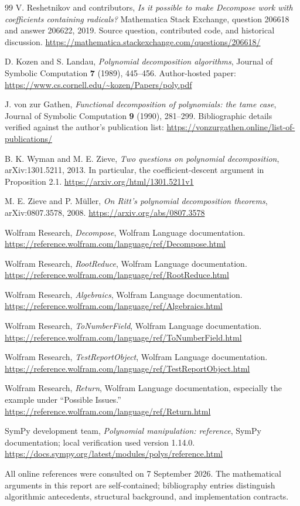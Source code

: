 \documentclass[11pt,a4paper]{article}
\numberwithin{equation}{section}
\theoremstyle{definition}
\theoremstyle{remark}
\begin{document}
\begin{thebibliography}{99}
V. Reshetnikov and contributors,
\emph{Is it possible to make Decompose work with coefficients containing
radicals?} Mathematica Stack Exchange, question 206618 and answer 206622,
2019. Source question, contributed code, and historical discussion.
\url{https://mathematica.stackexchange.com/questions/206618/}

D. Kozen and S. Landau,
\emph{Polynomial decomposition algorithms},
Journal of Symbolic Computation \textbf{7} (1989), 445--456.
Author-hosted paper:
\url{https://www.cs.cornell.edu/~kozen/Papers/poly.pdf}

J. von zur Gathen,
\emph{Functional decomposition of polynomials: the tame case},
Journal of Symbolic Computation \textbf{9} (1990), 281--299.
Bibliographic details verified against the author's publication list:
\url{https://vonzurgathen.online/list-of-publications/}

B. K. Wyman and M. E. Zieve,
\emph{Two questions on polynomial decomposition}, arXiv:1301.5211, 2013.
In particular, the coefficient-descent argument in Proposition 2.1.
\url{https://arxiv.org/html/1301.5211v1}

M. E. Zieve and P. M\"uller,
\emph{On Ritt's polynomial decomposition theorems}, arXiv:0807.3578, 2008.
\url{https://arxiv.org/abs/0807.3578}

Wolfram Research, \emph{Decompose}, Wolfram Language documentation.
\url{https://reference.wolfram.com/language/ref/Decompose.html}

Wolfram Research, \emph{RootReduce}, Wolfram Language documentation.
\url{https://reference.wolfram.com/language/ref/RootReduce.html}

Wolfram Research, \emph{Algebraics}, Wolfram Language documentation.
\url{https://reference.wolfram.com/language/ref/Algebraics.html}

Wolfram Research, \emph{ToNumberField}, Wolfram Language documentation.
\url{https://reference.wolfram.com/language/ref/ToNumberField.html}

Wolfram Research, \emph{TestReportObject}, Wolfram Language documentation.
\url{https://reference.wolfram.com/language/ref/TestReportObject.html}

Wolfram Research, \emph{Return}, Wolfram Language documentation,
especially the example under ``Possible Issues.''
\url{https://reference.wolfram.com/language/ref/Return.html}

SymPy development team, \emph{Polynomial manipulation: reference},
SymPy documentation; local verification used version 1.14.0.
\url{https://docs.sympy.org/latest/modules/polys/reference.html}

\end{thebibliography}
\noindent\small All online references were consulted on 7 September 2026.
The mathematical arguments in this report are self-contained; bibliography
entries distinguish algorithmic antecedents, structural background, and
implementation contracts.\normalsize
\end{document}
